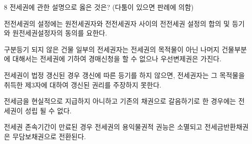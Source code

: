 \begin{question}{8}
전세권에 관한 설명으로 옳은 것은? (다툼이 있으면 판례에 의함)
\begin{choices}
  \item 전전세권의 설정에는 원전세권자와 전전세권자 사이의 전전세권 설정의 합의 및 등기와 원전세권설정자의 동의를 요한다.
  \item 구분등기 되지 않은 건물 일부의 전세권자는 전세권의 목적물이 아닌 나머지 건물부분에 대해서는 전세권에 기하여 경매신청을 할 수 없으나 우선변제권은 가진다.
  \item 전세권이 법정 갱신된 경우 갱신에 따른 등기를 하지 않으면, 전세권자는 그 목적물을 취득한 제3자에 대하여 갱신된 권리를 주장하지 못한다.
  \item 전세금을 현실적으로 지급하지 아니하고 기존의 채권으로 갈음하기로 한 경우에는 전세권이 성립 될 수 없다.
  \item 전세권 존속기간이 만료된 경우 전세권의 용익물권적 권능은 소멸되고 전세금반환채권은 무담보채권으로 전환된다.
\end{choices}
\end{question}

